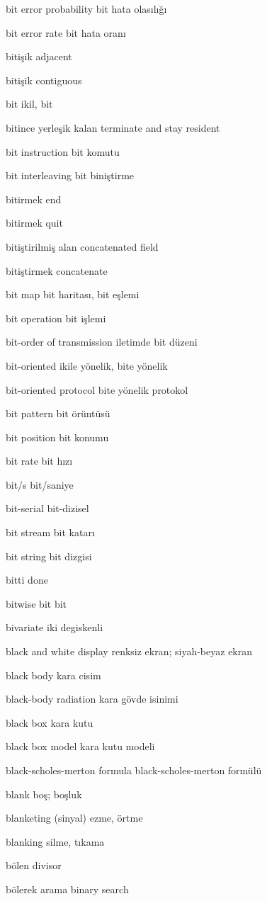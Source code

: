 \documentclass[12pt,fleqn]{article}\usepackage{../../common}
\begin{document}
bit error probability bit hata olasılığı

bit error rate bit hata oranı

bitişik adjacent

bitişik contiguous

bit ikil, bit

bitince yerleşik kalan terminate and stay resident

bit instruction bit komutu

bit interleaving bit biniştirme

bitirmek end

bitirmek quit

bitiştirilmiş alan concatenated field

bitiştirmek concatenate

bit map bit haritası, bit eşlemi

bit operation bit işlemi

bit-order of transmission iletimde bit düzeni

bit-oriented ikile yönelik, bite yönelik

bit-oriented protocol bite yönelik protokol

bit pattern bit örüntüsü

bit position bit konumu

bit rate bit hızı

bit/s bit/saniye

bit-serial bit-dizisel

bit stream bit katarı

bit string bit dizgisi

bitti done

bitwise bit bit

bivariate iki degiskenli

black and white display renksiz ekran; siyah-beyaz ekran

black body kara cisim

black-body radiation kara gövde isinimi

black box kara kutu

black box model kara kutu modeli

black-scholes-merton formula black-scholes-merton formülü

blank boş; boşluk

blanketing (sinyal) ezme, örtme

blanking silme, tıkama

bölen divisor

bölerek arama binary search
\end{document}
